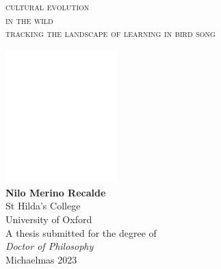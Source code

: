 
\thispagestyle{empty}
\pagecolor{chapterback}
\onecolumn
\normalsize
\begin{center}
    \color{white}
    \vspace*{1cm} %
    \begin{center}
        {\fontsize{39pt}{34pt}\selectfont\textsc{cultural evolution\\in the wild}\\[.5cm]\fontsize{16pt}{20pt}\selectfont\textsc{tracking the landscape of learning in bird song}\\}
    \end{center}
    \vspace{8cm} 
    \includegraphics[width=4.3cm]{figures/logos/oxlogo-round.png}\\
    \vspace{1cm} 
    \large
    \textbf{Nilo Merino Recalde} \\[.5cm]
    St Hilda's College\\
    University of Oxford\\

    \vskip 10pt
    A thesis submitted for the degree of\\
    \textit{Doctor of Philosophy}\\
    Michaelmas 2023

\end{center}
\restoregeometry


